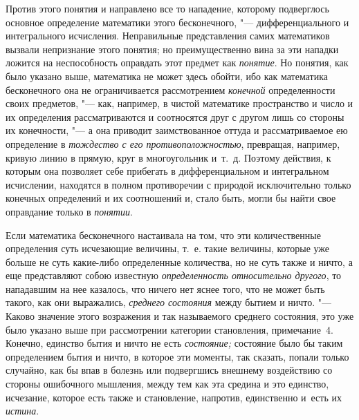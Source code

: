 Против этого понятия и направлено все то нападение, которому подверглось
основное определение математики этого бесконечного, "--- дифференциального и
интегрального исчисления. Неправильные представления самих математиков вызвали
непризнание этого понятия; но преимущественно вина за эти нападки ложится на
неспособность оправдать этот предмет как {\em понятие}. Но понятия, как было
указано выше, математика не может здесь обойти, ибо как математика бесконечного
она не ограничивается рассмотрением {\em конечной} определенности своих
предметов, "--- как, например, в чистой математике пространство и число и их
определения рассматриваются и соотносятся друг с другом лишь со стороны их
конечности, "--- а она приводит заимствованное оттуда и рассматриваемое ею
определение в {\em тождество с его противоположностью}, превращая, например,
кривую линию в прямую, круг в многоугольник и~т.~д. Поэтому действия, к которым
она позволяет себе прибегать в дифференциальном и интегральном исчислении,
находятся в полном противоречии с природой исключительно только конечных
определений и их соотношений и, стало быть, могли бы найти свое оправдание
только в {\em понятии}.

Если математика бесконечного настаивала на том, что эти количественные
определения суть исчезающие величины, т.~е. такие величины, которые уже больше
не суть какие-либо определенные количества, но не суть также и ничто, а еще
представляют собою известную {\em определенность относительно другого}, то
нападавшим на нее казалось, что ничего нет яснее того, что не может быть
такого, как они выражались, {\em среднего состояния} между бытием и ничто. "---
Каково значение этого возражения и так называемого среднего состояния, это уже
было указано выше при рассмотрении категории становления, примечание~4.
Конечно, единство бытия и ничто не есть {\em состояние;} состояние было бы
таким определением бытия и ничто, в которое эти моменты, так сказать, попали
только случайно, как бы впав в болезнь или подвергшись внешнему воздействию
со стороны ошибочного мышления, между тем как эта средина и это единство,
исчезание, которое есть также и становление, напротив, единственно
и~есть их {\em истина}.

